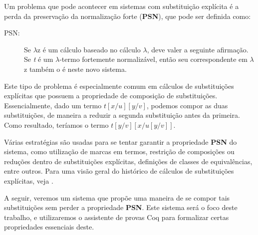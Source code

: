 Um problema que pode acontecer em sistemas com substituição explícita é a perda
da preservação da normalização forte (\textbf{PSN}), que pode ser definida como:

\begin{description}
    \item[PSN:] Se $\lambda$z é um cálculo baseado no cálculo $\lambda$, deve
        valer a seguinte afirmação. Se \emph{t} é um $\lambda$-termo fortemente
        normalizável, então seu correspondente em $\lambda$z também o é neste
        novo sistema.
\end{description}

Este tipo de problema é especialmente comum em cálculos de substituições
explícitas que possuem a propriedade de composição de substituições.
Essencialmente, dado um termo $t[x/u][y/v]$, podemos compor as duas
substituições, de maneira a reduzir a segunda substituição antes da primeira.
Como resultado, teríamos o termo $t[y/v][x/u[y/v]]$. 

Várias estratégias são usadas para se tentar garantir a propriedade \textbf{PSN}
do sistema, como utilização de marcas em termos, restrição de composições ou
reduções dentro de substituições explícitas, definições de classes de
equivalências, entre outros. Para uma visão geral do histórico de cálculos de
substituições explícitas, veja \cite{es_overview}.

A seguir, veremos um sistema que propõe uma maneira de se compor tais
substituições sem perder a propriedade \textbf{PSN}. Este sistema será o foco
deste trabalho, e utilizaremos o assistente de provas Coq para formalizar certas
propriedades essenciais deste.




